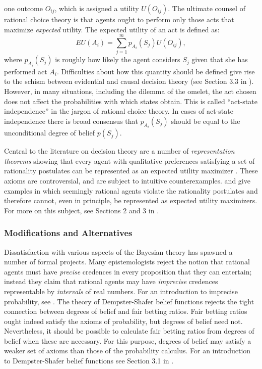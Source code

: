 one outcome $O_{ij}$, which is assigned a utility $U(O_{ij})$. The ultimate
counsel of rational choice theory is that agents ought to perform only those
acts that maximize {\em expected} utility. The expected utility of an act is
defined as:
$$ EU(A_i) = \sum_{j=1}^m p_{A_i}(S_j)U(O_{ij}),$$ where $p_{A_i}(S_j)$ is
roughly how likely the agent considers $S_j$ given that she has performed act
$A_i$. Difficulties about how this quantity should be defined give rise to the
schism between evidential and causal decision theory (see Section 3.3 in
\citealp{thoma2019decision}). However, in many situations, including the dilemma
of the omelet, the act chosen does not affect the probabilities with which
states obtain. This is called ``act-state independence'' in the jargon of
rational choice theory. In cases of act-state independence there is broad
consensus that $p_{A_i}(S_j)$ should be equal to the unconditional degree of
belief $p(S_j)$.

Central to the literature on decision theory are a number of {\em representation
theorems} showing that every agent with qualitative preferences satisfying a set
of rationality postulates can be represented as an expected utility maximizer
\citep{vonneumann1944theory, savage1954foundations}. These axioms are
controversial, and are subject to intuitive counterexamples.
\citet{allais1953lecomportement} and \citet{ellsberg1961risk} give examples in
which seemingly rational agents violate the rationality postulates and therefore
cannot, even in principle, be represented as expected utility maximizers. For
more on this subject, see Sections 2 and 3 in
\citet{sep-rationality-normative-utility}.

\subsubsection{Modifications and Alternatives}

Dissatisfaction with various aspects of the Bayesian theory has spawned a number
of formal projects. Many epistemologists reject the notion that rational agents
must have {\em precise} credences in every proposition that they can entertain;
instead they claim that rational agents may have {\em imprecise} credences
representable by {\em intervals} of real numbers. For an introduction to
imprecise probability, see \citet{mahtani2019imprecise}. The theory of
Dempster-Shafer belief functions \citep{dempster1968generalization,
shafer1976mathematical} rejects the tight connection between degrees of belief
and fair betting ratios. Fair betting ratios ought indeed satisfy the axioms of
probability, but degrees of belief need not. Nevertheless, it should be possible
to calculate fair betting ratios from degrees of belief when these are
necessary. For this purpose, degrees of belief may satisfy a weaker set of
axioms than those of the probability calculus. For an introduction to
Dempster-Shafer belief functions see Section 3.1 in \citet{sep-formal-belief}.

